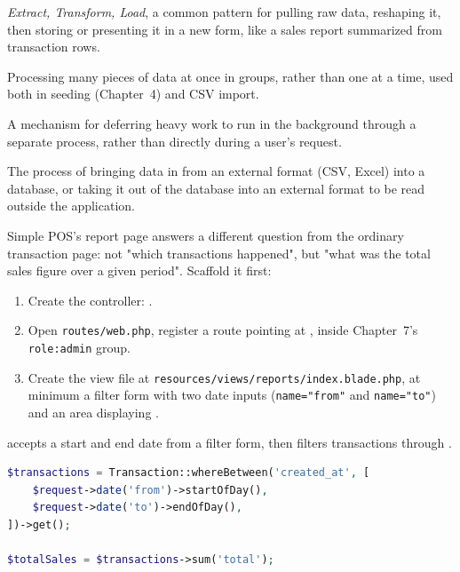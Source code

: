 \begin{istilahpenting}
\begin{description}[leftmargin=0pt,style=nextline]
  \item[ETL] \textit{Extract, Transform, Load}, a common pattern for pulling raw data, reshaping it, then storing or presenting it in a new form, like a sales report summarized from transaction rows.
  \item[Batch Processing] Processing many pieces of data at once in groups, rather than one at a time, used both in seeding (Chapter~4) and CSV import.
  \item[Queue] A mechanism for deferring heavy work to run in the background through a separate process, rather than directly during a user's request.
  \item[Import/Export] The process of bringing data in from an external format (CSV, Excel) into a database, or taking it out of the database into an external format to be read outside the application.
\end{description}
\end{istilahpenting}

Simple POS's report page answers a different question from the
ordinary transaction page: not "which transactions happened", but "what
was the total sales figure over a given period". Scaffold it first:

\begin{enumerate}
  \item Create the controller: .
  \item Open \texttt{routes/web.php}, register a 
    route pointing at , inside
    Chapter~7's \texttt{role:admin} group.
  \item Create the view file at
    \texttt{resources/views\allowbreak/reports\allowbreak/index.blade.php}, at minimum a
    filter form with two date inputs (\texttt{name="from"} and
    \texttt{name="to"}) and an area displaying .
\end{enumerate}

 accepts a start and end date from a
filter form, then filters transactions through .

\begin{lstlisting}[language=php, title=\lstfile{app/Http/Controllers/ReportController.php}]
$transactions = Transaction::whereBetween('created_at', [
    $request->date('from')->startOfDay(),
    $request->date('to')->endOfDay(),
])->get();

$totalSales = $transactions->sum('total');
\end{lstlisting}

